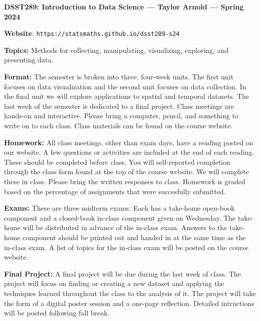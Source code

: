\documentclass[11pt, a4paper]{article}
\begin{document}
\begin{center}
\textbf{DSST289: Introduction to Data Science --- Taylor Arnold --- Spring 2024}
\end{center}

\vspace{0.5cm}

\textbf{Website}: \texttt{https://statsmaths.github.io/dsst289-s24}

\bigskip

\textbf{Topics:}
Methods for collecting, manipulating, visualizing, exploring, and presenting
data.

\bigskip

\textbf{Format:}
The semester is broken into three, four-week units. The first unit focuses on
data visualization and the second unit focuses on data collection. In the final
unit we will explore applications to spatial and temporal datasets. The
last week of the semester is dedicated to a final project. Class meetings are
hands-on and interactive. Please bring a computer, pencil, and something to
write on to each class. Class materials can be found on the course website.

\bigskip

\textbf{Homework:}
All class meetings, other than exam days, have a reading posted on our website.
A few questions or activities are included at the end of each reading. These
should be completed before class. You will self-reported completion through the class
form found at the top of the course website. We will complete these in class.
Please bring the written responses to class. Homework is graded based on the
percentage of assignments that were succesfully submitted.

\bigskip

\textbf{Exams:}
There are three midterm exams. Each has a take-home open-book component and 
a closed-book in-class component given on Wednesday. The take-home will be
distributed in advance of the in-class exam. Answers to the
take-home component should be printed out and handed in at the same time as
the in-class exam. A list of topics for the in-class exam will be posted on
the course website.

\bigskip

\textbf{Final Project:}
A final project will be due during the last week of class. The project will
focus on finding or creating a new dataset and applying the techniques learned
throughout the class to the analysis of it. The project will take the form of
a digital poster session and a one-page reflection. Detailed intructions will
be posted following fall break.
\end{document}

